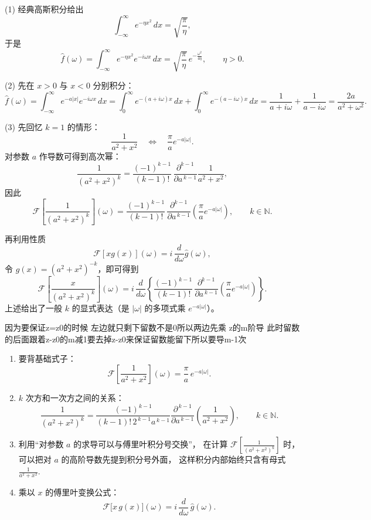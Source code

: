 \begin{solution}
(1) 经典高斯积分给出
\[
\int_{-\infty}^{\infty}e^{-\eta x^2}\,dx=\sqrt{\frac{\pi}{\eta}},
\]
于是
\[
\hat f(\omega)
=\int_{-\infty}^{\infty}e^{-\eta x^2}e^{-i\omega x}\,dx
=\sqrt{\frac{\pi}{\eta}}\,
   e^{-\frac{\omega^2}{4\eta}},\qquad \eta>0 .
\]

(2) 先在 $x>0$ 与 $x<0$ 分别积分：
\[
\hat f(\omega)
=\int_{-\infty}^{\infty}e^{-a|x|}e^{-i\omega x}\,dx
=\int_{0}^{\infty}e^{-(a+i\omega)x}\,dx
   +\int_{0}^{\infty}e^{-(a-i\omega)x}\,dx
=\frac1{a+i\omega}+\frac1{a-i\omega}
=\frac{2a}{a^2+\omega^2}.
\]

(3) 先回忆 $k=1$ 的情形：
\[
\frac1{a^2+x^2}
\quad\Longleftrightarrow\quad
\frac{\pi}{a}e^{-a|\omega|}.
\]
对参数 $a$ 作导数可得到高次幂：
\[
\frac1{(a^2+x^2)^k}
=\frac{(-1)^{k-1}}{(k-1)!}\,
  \frac{\partial^{k-1}}{\partial a^{\,k-1}}
  \frac1{a^2+x^2},
\]
因此
\[
\mathcal F\!\left[\frac1{(a^2+x^2)^k}\right](\omega)
=\frac{(-1)^{k-1}}{(k-1)!}\,
  \frac{\partial^{k-1}}{\partial a^{\,k-1}}
  \left(\frac{\pi}{a}e^{-a|\omega|}\right),
  \qquad k\in\mathbb N.
\]

再利用性质
\[
\mathcal F[xg(x)](\omega)
=i\,\frac{d}{d\omega}\hat g(\omega),
\]
令 $g(x)=(a^2+x^2)^{-k}$，即可得到
\[
\mathcal F\!\left[\frac{x}{(a^2+x^2)^k}\right](\omega)
=i\,\frac{d}{d\omega}
\left\{
\frac{(-1)^{k-1}}{(k-1)!}\,
  \frac{\partial^{k-1}}{\partial a^{\,k-1}}
  \left(\frac{\pi}{a}e^{-a|\omega|}\right)
\right\}.
\]
上述给出了一般 $k$ 的显式表达（是 $|\omega|$ 的多项式乘
$e^{-a|\omega|}$）。
\end{solution}
\begin{dxtips}
    因为要保证z=z0的时候 左边就只剩下留数不是0所以两边先乘 z的m阶导 此时留数的后面跟着z-z0的m减1要去掉z-z0来保证留数能留下所以要导m-1次
\end{dxtips}
\begin{dxtips}
\begin{enumerate}
  \item 要背基础式子：
  $$
  \mathcal F\left[\frac{1}{a^{2}+x^{2}}\right](\omega)
    = \frac{\pi}{a}\,e^{-a|\omega|}.
  $$

  \item $k$ 次方和一次方之间的关系：
  $$
  \frac{1}{(a^{2}+x^{2})^{k}}
    = \frac{(-1)^{k-1}}{(k-1)!\,2^{\,k-1}a^{\,k-1}}
      \frac{\partial^{\,k-1}}{\partial a^{\,k-1}}
      \left(\frac{1}{a^{2}+x^{2}}\right),
    \qquad k\in\mathbb N.
  $$

  \item 利用“对参数 $a$ 的求导可以与傅里叶积分号交换”，
  在计算
  $
  \mathcal F\left[\frac{1}{(a^{2}+x^{2})^{k}}\right]
  $
  时，可以把对 $a$ 的高阶导数先提到积分号外面，
  这样积分内部始终只含有母式
  $
  \frac{1}{a^{2}+x^{2}}.
  $

  \item 乘以 $x$ 的傅里叶变换公式：
  $$
  \mathcal F\big[x\,g(x)\big](\omega)
    = i\,\frac{d}{d\omega}\,\hat g(\omega).
  $$
\end{enumerate}
    
\end{dxtips}

